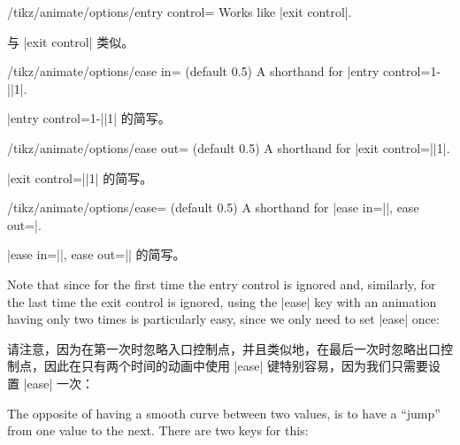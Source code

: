 \begin{key}{/tikz/animate/options/entry control=}
    Works like |exit control|.

    与 |exit control| 类似。


\end{key}

\begin{key}{/tikz/animate/options/ease in= (default 0.5)}
    A shorthand for |entry control={1-||}{1}|.

    |entry control={1-||}{1}| 的简写。

\end{key}

\begin{key}{/tikz/animate/options/ease out= (default 0.5)}
    A shorthand for |exit control={||}{1}|.

    |exit control={||}{1}| 的简写。

\end{key}

\begin{key}{/tikz/animate/options/ease= (default 0.5)}
    A shorthand for |ease in=||, ease out=|.

    |ease in=||, ease out=|| 的简写。


    Note that since for the first time the entry control is ignored and,
    similarly, for the last time the exit control is ignored, using the |ease|
    key with an animation having only two times is particularly easy, since we
    only need to set |ease| once:
    
    请注意，因为在第一次时忽略入口控制点，并且类似地，在最后一次时忽略出口控制点，因此在只有两个时间的动画中使用 |ease| 键特别容易，因为我们只需要设置 |ease| 一次：


\begin{codeexample}[
    preamble={\usetikzlibrary{animations}},
    animation list={0.333/\frac{1}{3},0.666/\frac{2}{3},1,1.333/1\frac{1}{3},1.666/1\frac{2}{3}},
]
\end{codeexample}
\end{key}

The opposite of having a smooth curve between two values, is to have a ``jump''
from one value to the next. There are two keys for this:

